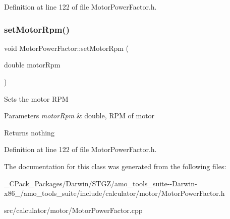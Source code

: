 Definition at line 122 of file Motor\+Power\+Factor.\+h.

\mbox{\label{class_motor_power_factor_a4154bf52c6c9c9e5fb2f0985d7ae3531}} 
\subsubsection{\texorpdfstring{set\+Motor\+Rpm()}{setMotorRpm()}\hspace{0.1cm}{\footnotesize\ttfamily [3/3]}}
{\footnotesize\ttfamily void Motor\+Power\+Factor\+::set\+Motor\+Rpm (\begin{DoxyParamCaption}\item[{double}]{motor\+Rpm }\end{DoxyParamCaption})\hspace{0.3cm}{\ttfamily [inline]}}

Sets the motor R\+PM


\begin{DoxyParams}{Parameters}
{\em motor\+Rpm} & double, R\+PM of motor\\
\hline
\end{DoxyParams}
\begin{DoxyReturn}{Returns}
nothing 
\end{DoxyReturn}


Definition at line 122 of file Motor\+Power\+Factor.\+h.



The documentation for this class was generated from the following files\+:\begin{DoxyCompactItemize}
\item 
\+\_\+\+C\+Pack\+\_\+\+Packages/\+Darwin/\+S\+T\+G\+Z/amo\+\_\+tools\+\_\+suite-\/-\/\+Darwin-\/x86\+\_/amo\+\_\+tools\+\_\+suite/include/calculator/motor/Motor\+Power\+Factor.\+h\item 
src/calculator/motor/Motor\+Power\+Factor.\+cpp\end{DoxyCompactItemize}
